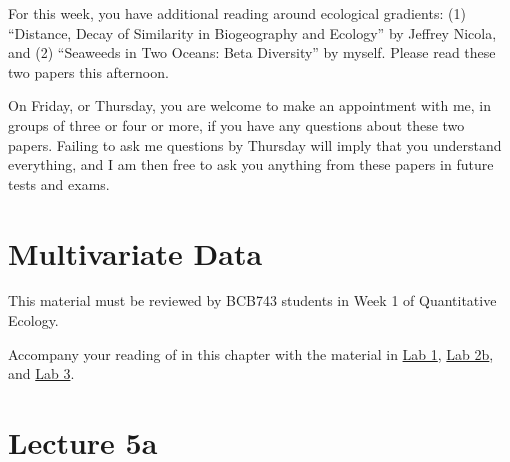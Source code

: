 \documentclass[
  10pt,
]{book}
\begin{document}
For this week, you have additional reading around ecological gradients:
(1) ``Distance, Decay of Similarity in Biogeography and Ecology'' by
Jeffrey Nicola, and (2) ``Seaweeds in Two Oceans: Beta Diversity'' by
myself. Please read these two papers this afternoon.

On Friday, or Thursday, you are welcome to make an appointment with me,
in groups of three or four or more, if you have any questions about
these two papers. Failing to ask me questions by Thursday will imply
that you understand everything, and I am then free to ask you anything
from these papers in future tests and exams.

\chapter{Multivariate Data}\label{sec-lect5}

\begin{tcolorbox}[enhanced jigsaw, leftrule=.75mm, arc=.35mm, title=\textcolor{quarto-callout-note-color}{\faInfo}\hspace{0.5em}{BCB743}, opacityback=0, colframe=quarto-callout-note-color-frame, toprule=.15mm, bottomtitle=1mm, opacitybacktitle=0.6, titlerule=0mm, colback=white, left=2mm, colbacktitle=quarto-callout-note-color!10!white, toptitle=1mm, rightrule=.15mm, breakable, coltitle=black, bottomrule=.15mm]

This material must be reviewed by BCB743 students in Week 1 of
Quantitative Ecology.

\end{tcolorbox}

\begin{tcolorbox}[enhanced jigsaw, leftrule=.75mm, arc=.35mm, title=\textcolor{quarto-callout-note-color}{\faInfo}\hspace{0.5em}{Also see:}, opacityback=0, colframe=quarto-callout-note-color-frame, toprule=.15mm, bottomtitle=1mm, opacitybacktitle=0.6, titlerule=0mm, colback=white, left=2mm, colbacktitle=quarto-callout-note-color!10!white, toptitle=1mm, rightrule=.15mm, breakable, coltitle=black, bottomrule=.15mm]

Accompany your reading of in this chapter with the material in
\href{Lab-01-introduction.html}{Lab 1}, \href{Lab-02b-env_dist.html}{Lab
2b}, and \href{Lab-03-biodiversity.html}{Lab 3}.

\end{tcolorbox}

\chapter*{Lecture 5a}\label{lecture-5a}
\end{document}
